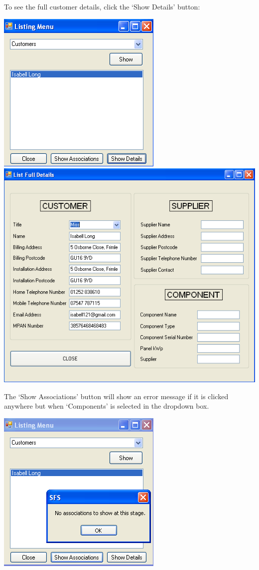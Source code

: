 		To see the full customer details, click the `Show Details' button:
		
		\includegraphics[scale=0.5]{customer-frmList-lfd_scrot}
		\includegraphics[scale=0.25]{customer-frmListFullDetails_scrot}
		
		The `Show Associations' button will show an error message if it is clicked anywhere but when `Components' is selected in the dropdown box.
		
		\includegraphics[scale=0.5]{customer-frmList-sa_scrot}
		
